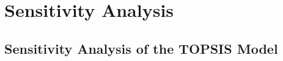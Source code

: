 \MinParskip{}

\section{Sensitivity Analysis}

\subsection{Sensitivity Analysis of the TOPSIS Model}
